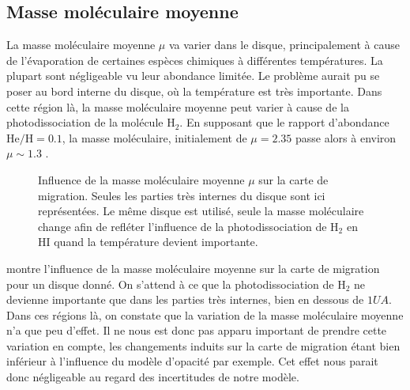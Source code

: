 \subsection{Masse moléculaire moyenne}
La masse moléculaire moyenne $\mu$ va varier dans le disque, principalement à cause de l'évaporation de certaines
espèces chimiques à différentes températures. La plupart sont négligeable vu leur abondance limitée. Le problème
aurait pu se poser au bord interne du disque, où la température est très importante. Dans cette région là, la masse moléculaire
moyenne peut varier à cause de la photodissociation de la molécule $\mathrm{H_2}$. En supposant que le rapport d'abondance
$\mathrm{He/H}=0.1$, la masse moléculaire, initialement de $\mu=2.35$ passe alors à environ $\mu\sim 1.3$ \citep[Annexe
A]{hure2000transition}.

\begin{figure}[htb]
\centering
{}\hfill
{}
\caption{Influence de la masse moléculaire moyenne $\mu$ sur la carte de migration. Seules les
parties très internes du disque sont ici représentées. Le même disque est utilisé, seule la masse
moléculaire change afin de refléter l'influence de la photodissociation de $\mathrm{H_2}$ en
$\mathrm{HI}$ quand la température devient importante. }\label{fig:migration_map_mmw}
\end{figure}

 montre l'influence de la masse moléculaire moyenne sur la carte de migration pour un disque
donné. On s'attend à ce que la photodissociation de $\mathrm{H_2}$ ne devienne importante que dans les parties très internes,
bien en dessous de $1\unit{UA}$. Dans ces régions là, on constate que la variation de la masse moléculaire moyenne n'a que peu
d'effet. Il ne nous est donc pas apparu important de prendre cette variation en compte, les changements induits sur la carte de
migration étant bien inférieur à l'influence du modèle d'opacité par exemple. Cet effet nous parait donc négligeable au regard
des incertitudes de notre modèle.